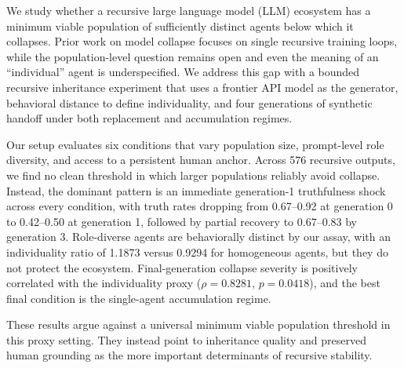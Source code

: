 We study whether a recursive large language model (LLM) ecosystem has a minimum viable population of sufficiently distinct agents below which it collapses. Prior work on model collapse focuses on single recursive training loops, while the population-level question remains open and even the meaning of an ``individual'' agent is underspecified. We address this gap with a bounded recursive inheritance experiment that uses a frontier API model as the generator, behavioral distance to define individuality, and four generations of synthetic handoff under both replacement and accumulation regimes.

Our setup evaluates six conditions that vary population size, prompt-level role diversity, and access to a persistent human anchor. Across 576 recursive outputs, we find no clean threshold in which larger populations reliably avoid collapse. Instead, the dominant pattern is an immediate generation-1 truthfulness shock across every condition, with truth rates dropping from 0.67--0.92 at generation 0 to 0.42--0.50 at generation 1, followed by partial recovery to 0.67--0.83 by generation 3. Role-diverse agents are behaviorally distinct by our assay, with an individuality ratio of 1.1873 versus 0.9294 for homogeneous agents, but they do not protect the ecosystem. Final-generation collapse severity is positively correlated with the individuality proxy ($\rho=0.8281$, $p=0.0418$), and the best final condition is the single-agent accumulation regime.

These results argue against a universal minimum viable population threshold in this proxy setting. They instead point to inheritance quality and preserved human grounding as the more important determinants of recursive stability.
